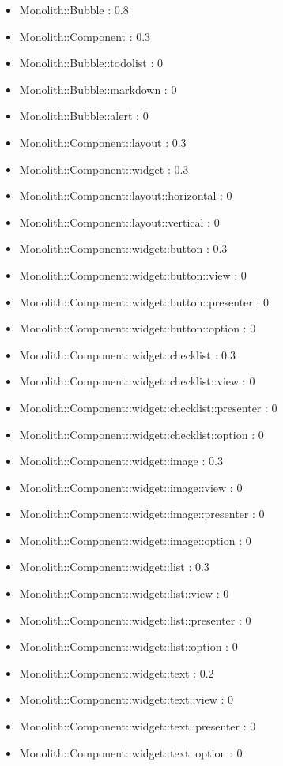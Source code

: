 \begin{itemize}
\item Monolith::Bubble : 0.8
\item Monolith::Component : 0.3
\item Monolith::Bubble::todolist : 0
\item Monolith::Bubble::markdown : 0
\item Monolith::Bubble::alert : 0
\item Monolith::Component::layout : 0.3
\item Monolith::Component::widget : 0.3
\item Monolith::Component::layout::horizontal : 0
\item Monolith::Component::layout::vertical : 0
\item Monolith::Component::widget::button : 0.3
\item Monolith::Component::widget::button::view : 0
\item Monolith::Component::widget::button::presenter : 0
\item Monolith::Component::widget::button::option : 0
\item Monolith::Component::widget::checklist : 0.3
\item Monolith::Component::widget::checklist::view : 0
\item Monolith::Component::widget::checklist::presenter : 0
\item Monolith::Component::widget::checklist::option : 0
\item Monolith::Component::widget::image : 0.3
\item Monolith::Component::widget::image::view : 0
\item Monolith::Component::widget::image::presenter : 0
\item Monolith::Component::widget::image::option : 0
\item Monolith::Component::widget::list : 0.3
\item Monolith::Component::widget::list::view : 0
\item Monolith::Component::widget::list::presenter : 0
\item Monolith::Component::widget::list::option : 0
\item Monolith::Component::widget::text : 0.2
\item Monolith::Component::widget::text::view : 0
\item Monolith::Component::widget::text::presenter : 0
\item Monolith::Component::widget::text::option : 0
\end{itemize}

